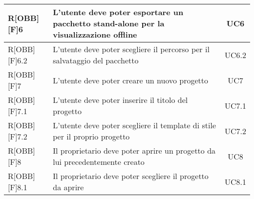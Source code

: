\begin{longtable}{|l|p{}|c|}
		R[OBB][F]6 & L'utente deve poter esportare un pacchetto stand-alone per la visualizzazione offline & UC6 \\ \midrule
		R[OBB][F]6.2 & L'utente deve poter scegliere il percorso per il salvataggio del pacchetto & UC6.2 \\ \midrule
		
		R[OBB][F]7 & L'utente deve poter creare un nuovo progetto & UC7 \\ \midrule
		R[OBB][F]7.1 & L'utente deve poter inserire il titolo del progetto & UC7.1 \\ \midrule
		R[OBB][F]7.2 & L'utente deve poter scegliere il template di stile per il proprio progetto & UC7.2 \\ \midrule
		
		R[OBB][F]8 & Il proprietario deve poter aprire un progetto da lui precedentemente creato & UC8 \\ \midrule
		R[OBB][F]8.1 & Il proprietario deve poter scegliere il progetto da aprire & UC8.1 \\ \midrule
		

\end{longtable}
